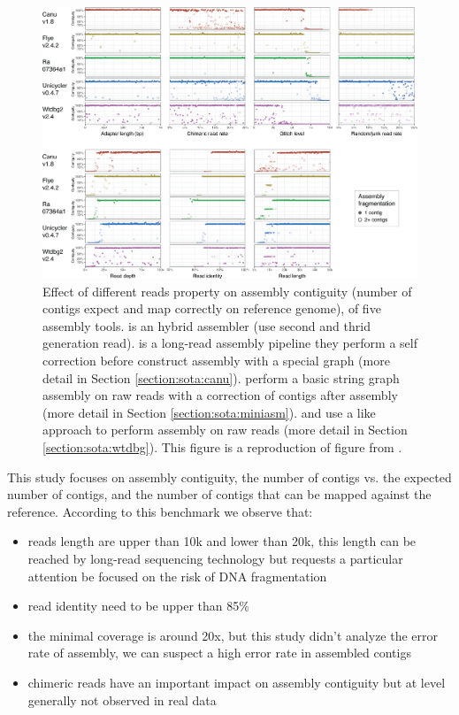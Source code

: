 \documentclass[main.tex]{subfiles}
\begin{document}
\begin{figure}
    \centering
    \includegraphics[width=\textwidth]{introduction/images/rrwick_bench.png}
    \caption{Effect of different reads property on assembly contiguity (number of contigs expect and map correctly on reference genome), of five assembly tools.  is an hybrid assembler (use second and thrid generation read). \canu is a long-read assembly pipeline they perform a self correction before construct assembly with a special \OLC graph (more detail in Section \ref{section:sota:canu}).  perform a basic string graph assembly on raw reads with a correction of contigs after assembly (more detail in Section \ref{section:sota:miniasm}). \wtdbg and  use a \DBG like approach to perform assembly on raw reads (more detail in Section \ref{section:sota:wtdbg}). This figure is a reproduction of figure from \cite{long_read_assembler_comparison}.}
    \label{intro:fig:rrwick_bench}
\end{figure}

This study focuses on assembly contiguity, the number of contigs vs. the expected number of contigs, and the number of contigs that can be mapped against the reference.
According to this benchmark we observe that:
\begin{itemize}
    \item reads length are upper than 10k and lower than 20k, this length can be reached by long-read sequencing technology but requests a particular attention be focused on the risk of DNA fragmentation
    \item read identity need to be upper than 85\%
    \item the minimal coverage is around 20x, but this study didn't analyze the error rate of assembly, we can suspect a high error rate in assembled contigs
    \item chimeric reads have an important impact on assembly contiguity but at level generally not observed in real data 
\end{itemize}
\end{document}
